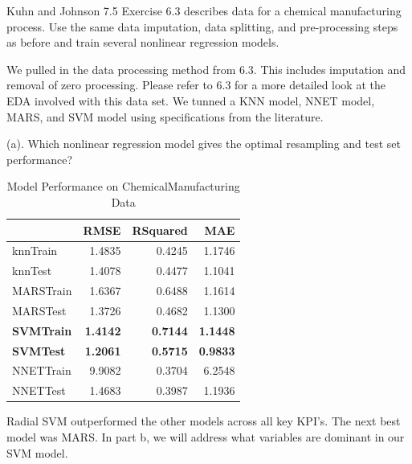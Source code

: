 \documentclass[]{report}
\begin{document}

\begin{question}{Kuhn and Johnson 7.5}
Exercise 6.3 describes data for a chemical manufacturing process. Use the same data imputation, data splitting, and pre-processing steps as before and train several nonlinear regression models.
\end{question}

We pulled in the data processing method from 6.3. This includes
imputation and removal of zero processing. Please refer to 6.3 for a
more detailed look at the EDA involved with this data set. We tunned a
KNN model, NNET model, MARS, and SVM model using specifications from the
literature.

\begin{subquestion}{(a).}
Which nonlinear regression model gives the optimal resampling and test set performance? 
\end{subquestion}

\begin{table}[H]

\caption{\label{tab:unnamed-chunk-1}Model Performance on ChemicalManufacturing Data}
\centering
\begin{tabular}[t]{l|r|r|r}
\hline
\textbf{ } & \textbf{RMSE} & \textbf{RSquared} & \textbf{MAE}\\
\hline
\rowcolor{gray!6}  knnTrain & 1.4835 & 0.4245 & 1.1746\\
\hline
knnTest & 1.4078 & 0.4477 & 1.1041\\
\hline
\rowcolor{gray!6}  MARSTrain & 1.6367 & 0.6488 & 1.1614\\
\hline
MARSTest & 1.3726 & 0.4682 & 1.1300\\
\hline
\rowcolor{gray!6}  \rowcolor[HTML]{d9f2e6}  \textbf{SVMTrain} & \textbf{1.4142} & \textbf{0.7144} & \textbf{1.1448}\\
\hline
\rowcolor[HTML]{d9f2e6}  \textbf{SVMTest} & \textbf{1.2061} & \textbf{0.5715} & \textbf{0.9833}\\
\hline
\rowcolor{gray!6}  NNETTrain & 9.9082 & 0.3704 & 6.2548\\
\hline
NNETTest & 1.4683 & 0.3987 & 1.1936\\
\hline
\end{tabular}
\end{table}

Radial SVM outperformed the other models across all key KPI's. The next
best model was MARS. In part b, we will address what variables are
dominant in our SVM model.
\end{document}

